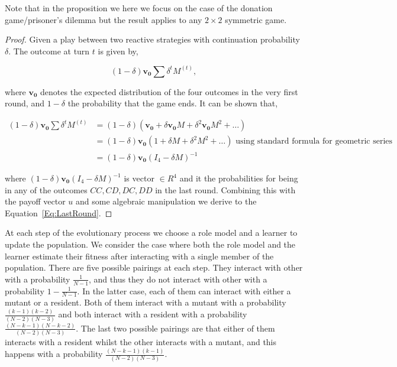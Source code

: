 \documentclass[11pt]{article}
\theoremstyle{plainCl1}
\theoremstyle{plainCl2}
\begin{document}
Note that in the proposition we here we focus on the case of the donation game/prisoner's
dilemma but the result applies to any \(2 \times 2\) symmetric game.

\begin{proof}
Given a play between two reactive strategies with continuation probability
$\delta$. The outcome at turn \(t\) is given by,

\begin{equation}\label{eq:}
  (1 - \delta) \mathbf{v_0} \sum \delta^{t} M^{(t)},
\end{equation}

where $\mathbf{v_0}$ denotes the expected distribution of the four outcomes in
the very first round, and \(1- \delta\) the probability that the game ends. It
can be shown that,

\begin{align*}
  (1 - \delta) \mathbf{v_0} \sum \delta^{t} M^{(t)} & = (1 - \delta)(\mathbf{v_0} + \delta \mathbf{v_0} M + \delta^{2}\mathbf{v_0} M ^{2} + \dots )\\ 
   & = (1 - \delta)\mathbf{v_0} (1 + \delta M + \delta^{2}M ^{2} + \dots ) \text{ using standard formula for geometric series}\\ 
   & = (1 - \delta)\mathbf{v_0}(I_4 - \delta M)^{-1}
\end{align*}

where \((1 - \delta)\mathbf{v_0}(I_4 - \delta M)^{-1}\) is vector \(\in R^{4}\)
and it the probabilities for being in any of the outcomes \(CC, CD, DC, DD\) in
the last round. Combining this with the payoff vector \(u\) and some algebraic
manipulation we derive to the Equation~\ref{Eq:LastRound}.
\end{proof}

At each step of the evolutionary process we choose a role model and a learner to
update the population. We consider the case where both the role model and the
learner estimate their fitness after interacting with a single member of the
population. There are five possible pairings at each step. They interact with
other with a probability \(\frac{1}{N - 1}\), and thus they do not interact with
other with a probability \(1 - \frac{1}{N - 1}\). In the latter case, each of
them can interact with either a mutant or a resident. Both of them interact with
a mutant with a probability $\frac{(k-1)(k-2)}{(N-2)(N-3)}$ and both interact
with a resident with a probability $\frac{(N-k-1)(N-k-2)}{(N-2)(N-3)}$. The last
two possible pairings are that either of them interacts with a resident whilst
the other interacts with a mutant, and this happens with a probability
$\frac{(N-k-1)(k-1)}{(N-2)(N-3)}$.
\end{document}
